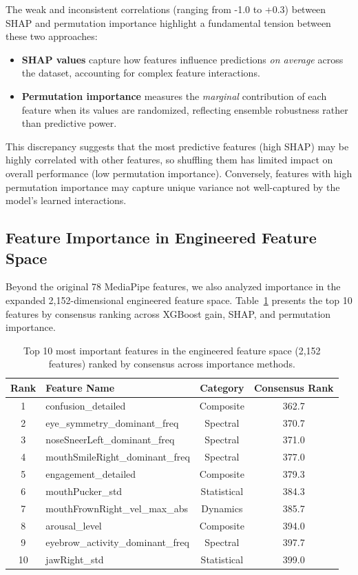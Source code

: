 The weak and inconsistent correlations (ranging from -1.0 to +0.3) between SHAP and permutation importance highlight a fundamental tension between these two approaches:
\begin{itemize}
    \item \textbf{SHAP values} capture how features influence predictions \textit{on average} across the dataset, accounting for complex feature interactions.
    \item \textbf{Permutation importance} measures the \textit{marginal} contribution of each feature when its values are randomized, reflecting ensemble robustness rather than predictive power.
\end{itemize}

This discrepancy suggests that the most predictive features (high SHAP) may be highly correlated with other features, so shuffling them has limited impact on overall performance (low permutation importance). Conversely, features with high permutation importance may capture unique variance not well-captured by the model's learned interactions.

\subsection{Feature Importance in Engineered Feature Space}
\label{sec:engineered-feature-importance}

Beyond the original 78 MediaPipe features, we also analyzed importance in the expanded 2,152-dimensional engineered feature space. Table~\ref{tab:top-engineered-features} presents the top 10 features by consensus ranking across XGBoost gain, SHAP, and permutation importance.

\begin{table}[t]
\centering
\caption{Top 10 most important features in the engineered feature space (2,152 features) ranked by consensus across importance methods.}
\label{tab:top-engineered-features}
\begin{tabular}{clcc}
\toprule
\textbf{Rank} & \textbf{Feature Name} & \textbf{Category} & \textbf{Consensus Rank} \\
\midrule
1 & confusion\_detailed & Composite & 362.7 \\
2 & eye\_symmetry\_dominant\_freq & Spectral & 370.7 \\
3 & noseSneerLeft\_dominant\_freq & Spectral & 371.0 \\
4 & mouthSmileRight\_dominant\_freq & Spectral & 377.0 \\
5 & engagement\_detailed & Composite & 379.3 \\
6 & mouthPucker\_std & Statistical & 384.3 \\
7 & mouthFrownRight\_vel\_max\_abs & Dynamics & 385.7 \\
8 & arousal\_level & Composite & 394.0 \\
9 & eyebrow\_activity\_dominant\_freq & Spectral & 397.7 \\
10 & jawRight\_std & Statistical & 399.0 \\
\bottomrule
\end{tabular}
\end{table}

